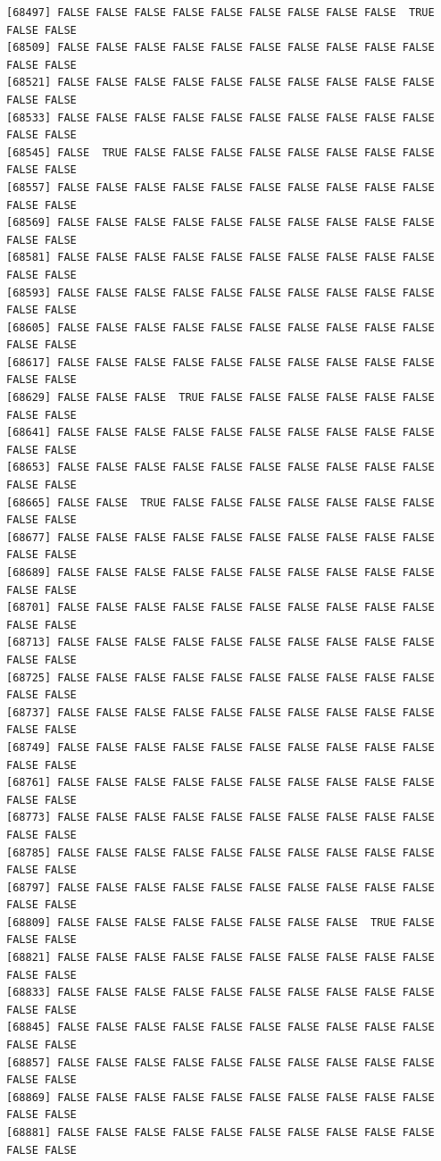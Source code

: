 \documentclass[
  a4paper,
  DIV=11,
  numbers=noendperiod]{scrartcl}
\begin{document}
\begin{verbatim}
[68497] FALSE FALSE FALSE FALSE FALSE FALSE FALSE FALSE FALSE  TRUE FALSE FALSE
[68509] FALSE FALSE FALSE FALSE FALSE FALSE FALSE FALSE FALSE FALSE FALSE FALSE
[68521] FALSE FALSE FALSE FALSE FALSE FALSE FALSE FALSE FALSE FALSE FALSE FALSE
[68533] FALSE FALSE FALSE FALSE FALSE FALSE FALSE FALSE FALSE FALSE FALSE FALSE
[68545] FALSE  TRUE FALSE FALSE FALSE FALSE FALSE FALSE FALSE FALSE FALSE FALSE
[68557] FALSE FALSE FALSE FALSE FALSE FALSE FALSE FALSE FALSE FALSE FALSE FALSE
[68569] FALSE FALSE FALSE FALSE FALSE FALSE FALSE FALSE FALSE FALSE FALSE FALSE
[68581] FALSE FALSE FALSE FALSE FALSE FALSE FALSE FALSE FALSE FALSE FALSE FALSE
[68593] FALSE FALSE FALSE FALSE FALSE FALSE FALSE FALSE FALSE FALSE FALSE FALSE
[68605] FALSE FALSE FALSE FALSE FALSE FALSE FALSE FALSE FALSE FALSE FALSE FALSE
[68617] FALSE FALSE FALSE FALSE FALSE FALSE FALSE FALSE FALSE FALSE FALSE FALSE
[68629] FALSE FALSE FALSE  TRUE FALSE FALSE FALSE FALSE FALSE FALSE FALSE FALSE
[68641] FALSE FALSE FALSE FALSE FALSE FALSE FALSE FALSE FALSE FALSE FALSE FALSE
[68653] FALSE FALSE FALSE FALSE FALSE FALSE FALSE FALSE FALSE FALSE FALSE FALSE
[68665] FALSE FALSE  TRUE FALSE FALSE FALSE FALSE FALSE FALSE FALSE FALSE FALSE
[68677] FALSE FALSE FALSE FALSE FALSE FALSE FALSE FALSE FALSE FALSE FALSE FALSE
[68689] FALSE FALSE FALSE FALSE FALSE FALSE FALSE FALSE FALSE FALSE FALSE FALSE
[68701] FALSE FALSE FALSE FALSE FALSE FALSE FALSE FALSE FALSE FALSE FALSE FALSE
[68713] FALSE FALSE FALSE FALSE FALSE FALSE FALSE FALSE FALSE FALSE FALSE FALSE
[68725] FALSE FALSE FALSE FALSE FALSE FALSE FALSE FALSE FALSE FALSE FALSE FALSE
[68737] FALSE FALSE FALSE FALSE FALSE FALSE FALSE FALSE FALSE FALSE FALSE FALSE
[68749] FALSE FALSE FALSE FALSE FALSE FALSE FALSE FALSE FALSE FALSE FALSE FALSE
[68761] FALSE FALSE FALSE FALSE FALSE FALSE FALSE FALSE FALSE FALSE FALSE FALSE
[68773] FALSE FALSE FALSE FALSE FALSE FALSE FALSE FALSE FALSE FALSE FALSE FALSE
[68785] FALSE FALSE FALSE FALSE FALSE FALSE FALSE FALSE FALSE FALSE FALSE FALSE
[68797] FALSE FALSE FALSE FALSE FALSE FALSE FALSE FALSE FALSE FALSE FALSE FALSE
[68809] FALSE FALSE FALSE FALSE FALSE FALSE FALSE FALSE  TRUE FALSE FALSE FALSE
[68821] FALSE FALSE FALSE FALSE FALSE FALSE FALSE FALSE FALSE FALSE FALSE FALSE
[68833] FALSE FALSE FALSE FALSE FALSE FALSE FALSE FALSE FALSE FALSE FALSE FALSE
[68845] FALSE FALSE FALSE FALSE FALSE FALSE FALSE FALSE FALSE FALSE FALSE FALSE
[68857] FALSE FALSE FALSE FALSE FALSE FALSE FALSE FALSE FALSE FALSE FALSE FALSE
[68869] FALSE FALSE FALSE FALSE FALSE FALSE FALSE FALSE FALSE FALSE FALSE FALSE
[68881] FALSE FALSE FALSE FALSE FALSE FALSE FALSE FALSE FALSE FALSE FALSE FALSE

\end{verbatim}
\end{document}

